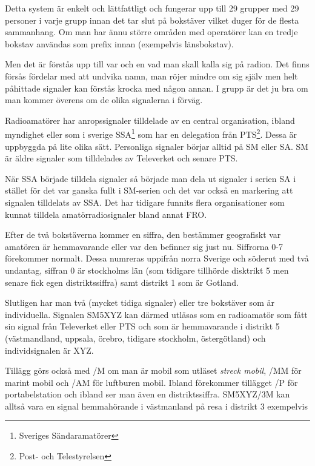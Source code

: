 Detta system är enkelt och lättfattligt och fungerar upp till 29 grupper med 29 personer i varje grupp innan det tar slut på bokstäver vilket duger för de flesta sammanhang. Om man har ännu större områden med operatörer kan en tredje bokstav användas som prefix innan (exempelvis länsbokstav).

Men det är förstås upp till var och en vad man skall kalla sig på radion. Det finns försås fördelar med att undvika namn, man röjer mindre om sig själv men helt påhittade signaler kan förstås krocka med någon annan. I grupp är det ju bra om man kommer överens om de olika signalerna i förväg.


Radioamatörer har anropssignaler tilldelade av en central organisation, ibland myndighet eller som i sverige SSA\footnote{Sveriges Sändaramatörer} som har en delegation från PTS\footnote{Post- och Telestyrelsen}. Dessa är uppbyggda på lite olika sätt. Personliga signaler börjar alltid på SM eller SA. SM är äldre signaler som tilldelades av Televerket och senare PTS. 

När SSA började tilldela signaler så började man dela ut signaler i serien SA i stället för det var ganska fullt i SM-serien och det var också en markering att signalen tilldelats av SSA. Det har tidigare funnits flera organisationer som kunnat tilldela amatörradiosignaler bland annat FRO.

Efter de två bokstäverna kommer en siffra, den bestämmer geografiskt var amatören är hemmavarande eller var den befinner sig just nu. Siffrorna 0-7 förekommer normalt. Dessa numreras uppifrån norra Sverige och söderut med två undantag, siffran 0 är stockholms län (som tidigare tillhörde disktrikt 5 men senare fick egen distriktssiffra) samt distrikt 1 som är Gotland. 

Slutligen har man två (mycket tidiga signaler) eller tre bokstäver som är individuella. Signalen SM5XYZ kan därmed utläsas som en radioamatör som fått sin signal från Televerket eller PTS och som är hemmavarande i distrikt 5 (västmandland, uppsala, örebro, tidigare stockholm, östergötland) och individsignalen är XYZ.

Tillägg görs också med /M om man är mobil som utläset \textit{streck mobil}, /MM för marint mobil och /AM för luftburen mobil. Ibland förekommer tillägget /P för portabelstation och ibland ser man även en distriktssiffra. SM5XYZ/3M kan alltså vara en signal hemmahörande i västmanland på resa i distrikt 3 exempelvis 

